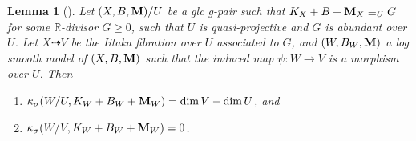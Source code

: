 \documentclass[11pt]{amsart}
\numberwithin{equation}{section}
\newcommand{\Mm}{{\bf{M}}}
\newcommand{\Rr}{\mathbb{R}}
\newtheorem{lem}[thm]{Lemma}
\theoremstyle{definition}
\theoremstyle{definition}
\theoremstyle{definition}
\begin{document}
\begin{lem}[{\cite[Version 2, Lemma 8.3]{HL21}}]\label{lem: iitaka fibration numerical abundant divisor gpair dimension}
Let $(X,B,\Mm)/U$ be a glc g-pair such that $K_X+B+\Mm_X\equiv_{U}G$ for some $\Rr$-divisor $G\geq 0$, such that $U$ is quasi-projective and $G$ is abundant over $U$. Let $X\dashrightarrow V$ be the Iitaka fibration over $U$ associated to $G$, and $(W,B_W,\Mm)$ a log smooth model of $(X,B,\Mm)$ such that the induced map $\psi: W\rightarrow V$ is a morphism over $U$. Then
\begin{enumerate}
    \item $\kappa_{\sigma}(W/U,K_W+B_W+\Mm_W)=\dim V-\dim U$, and
    \item $\kappa_{\sigma}(W/V,K_W+B_W+\Mm_W)=0$.
\end{enumerate}
\end{lem}
\end{document}
